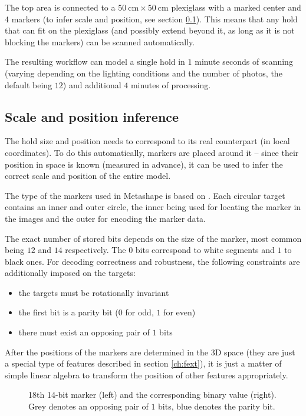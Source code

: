 The top area is connected to a $\SI{50}{\centi\meter} \times \SI{50}{\centi\meter}$ plexiglass with a marked center and 4 markers (to infer scale and position, see section \ref{sec:markersss}). This means that any hold that can fit on the plexiglass (and possibly extend beyond it, as long as it is not blocking the markers) can be scanned automatically.

The resulting workflow can model a single hold in $1$ minute seconds of scanning (varying depending on the lighting conditions and the number of photos, the default being $12$) and additional $4$ minutes of processing.

\subsection{Scale and position inference}\label{sec:markersss}
The hold size and position needs to correspond to its real counterpart (in local coordinates).
To do this automatically, markers are placed around it -- since their position in space is known (measured in advance), it can be used to infer the correct scale and position of the entire model.

The type of the markers used in Metashape is based on \citet{schneider19913,borisPatent}.
Each circular target contains an inner and outer circle, the inner being used for locating the marker in the images and the outer for encoding the marker data.

The exact number of stored bits depends on the size of the marker, most common being $12$ and $14$ respectively.
The $0$ bits correspond to white segments and $1$ to black ones.
For decoding correctness and robustness, the following constraints are additionally imposed on the targets:

\begin{itemize}
	\item the targets must be rotationally invariant
	\item the first bit is a parity bit ($0$ for odd, $1$ for even)
	\item there must exist an opposing pair of $1$ bits
\end{itemize}

After the positions of the markers are determined in the 3D space (they are just a special type of features described in section \ref{ch:fext}), it is just a matter of simple linear algebra to transform the position of other features appropriately.

\begin{figure}[t]
	\centering
	
	\caption{18th 14-bit marker (left) and the corresponding binary value (right). Grey denotes an opposing pair of $1$ bits, blue denotes the parity bit.}
\end{figure}

